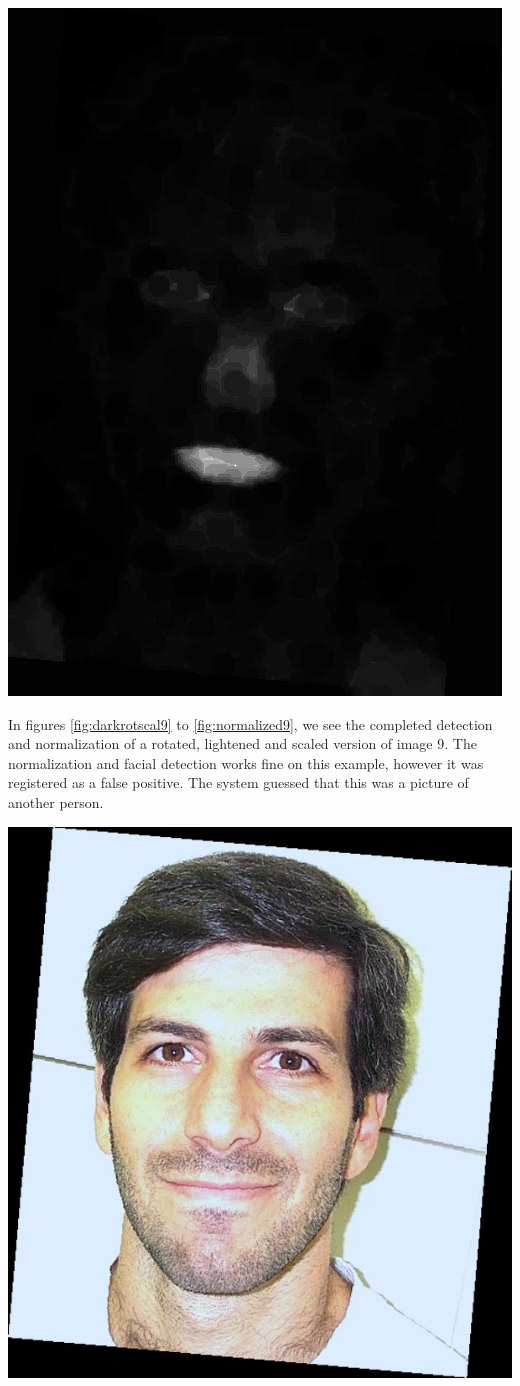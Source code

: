 \begin{Figure}
  \centering
    \includegraphics[width=0.5\columnwidth]{images/im7_mouth.jpg}
\end{Figure}



In figures \ref{fig:darkrotscal9} to \ref{fig:normalized9}, we see the completed detection and normalization of a rotated, lightened and scaled version of image 9. The normalization and facial detection works fine on this example, however it was registered as a false positive. The system guessed that this was a picture of another person. 


\begin{Figure}
  \centering
    \includegraphics[width=0.5\columnwidth]{images/im9_img.jpg}
\end{Figure}

